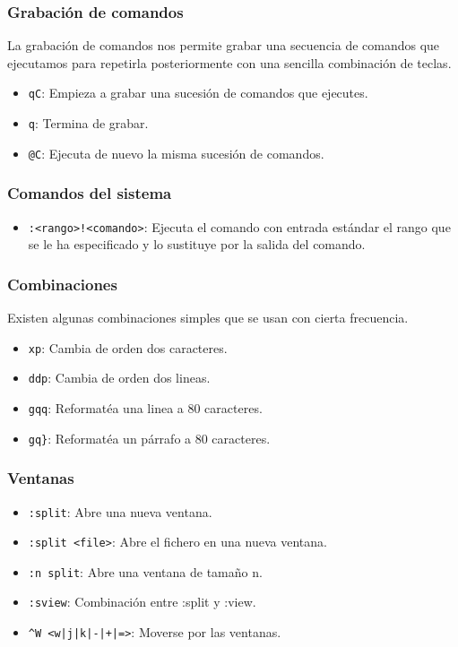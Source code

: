 \documentclass[10pt]{beamer}
\begin{document}
  \begin{frame}[containsverbatim]
    \frametitle{Grabación de comandos}
    La grabación de comandos nos permite grabar una secuencia de comandos que
    ejecutamos para repetirla posteriormente con una sencilla combinación de
    teclas.
    \begin{itemize}
      \item \verb+qC+: Empieza a grabar una sucesión de comandos que ejecutes.
      \item \verb+q+: Termina de grabar.
      \item \verb+@C+: Ejecuta de nuevo la misma sucesión de comandos.
    \end{itemize}
  \end{frame}
  
  \begin{frame}[containsverbatim]
    \frametitle{Comandos del sistema}

    \begin{itemize}
      \item \verb+:<rango>!<comando>+: Ejecuta el comando con entrada estándar
      el rango que se le ha especificado y lo sustituye por la salida del
      comando.
    \end{itemize}
  \end{frame}

  \begin{frame}[containsverbatim]
    \frametitle{Combinaciones}
    Existen algunas combinaciones simples que se usan con cierta frecuencia.
    \begin{itemize}
      \item \verb+xp+: Cambia de orden dos caracteres.
      \item \verb+ddp+: Cambia de orden dos lineas.
      \item \verb+gqq+: Reformatéa una linea a 80 caracteres.
      \item \verb+gq}+: Reformatéa un párrafo a 80 caracteres.
    \end{itemize}
  \end{frame}

  \begin{frame}[containsverbatim]
    \frametitle{Ventanas}
    \begin{itemize}
      \item \verb+:split+: Abre una nueva ventana.
      \item \verb+:split <file>+: Abre el fichero en una nueva ventana.
      \item \verb+:n split+: Abre una ventana de tamaño n.
      \item \verb+:sview+: Combinación entre :split y :view.
      \item \verb#^W <w|j|k|-|+|=>#: Moverse por las ventanas.
    \end{itemize}
  \end{frame}
  
\end{document}
